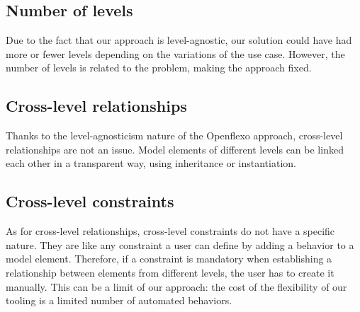 
  \subsection{Number of levels}

  Due to the fact that our approach is level-agnostic, our solution could have had more
  or fewer levels depending on the variations of the use case. However, the number of levels is related
  to the problem, making the approach fixed.

  \subsection{Cross-level relationships}


  Thanks to the level-agnosticism nature of the Openflexo approach, cross-level
  relationships are not an issue. Model elements of different levels can be
  linked each other in a transparent way, using inheritance or instantiation.

  \subsection{Cross-level constraints}


  As for cross-level relationships, cross-level constraints do not have a
  specific nature. They are like any constraint a user can define by adding a
  behavior to a model element. Therefore, if a constraint is mandatory when
  establishing a relationship between elements from different levels, the user
  has to create it manually. This can be a limit of our approach: the cost of
  the flexibility of our tooling is a limited number of automated behaviors. 
  
  

